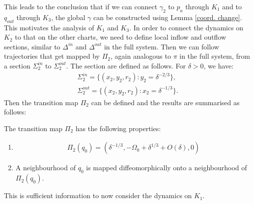 This leads to the conclusion that if we can connect $\gamma_2$ to $p_a$  through $K_1$ and to $q_{out}$ through $K_3$, the global $\gamma$ can be constructed using Lemma \ref{coord. change}.
This motivates the analysis of $K_1$ and $K_3$.
In order to connect the dynamics on $K_2$ to that on the other charts, we need to define local inflow and outflow sections, similar to $\Delta^{in}$ and $\Delta^{out}$ in the full system.
Then we can follow trajectories that get mapped by $\Pi_2$, again analogous to $\pi$ in the full system, from a section $\Sigma^{in}_2$ to $\Sigma^{out}_2$.
The section are defined as follows. For $\delta>0$, we have:
\begin{align*}
\Sigma^{in}_2= \{ (x_2,y_2,r_2): y_2= \delta^{-2/3} \},\\
\Sigma^{out}_2 = \{ (x_2,y_2,r_2): x_2 = \delta^{-1/3} \}.
\end{align*}
Then the transition map $\Pi_2$ can be defined and the results are summarised as follows:
\begin{prop}
The transition map $\Pi_2$ has the following properties:
\begin{enumerate}
\item
\begin{align*}
\Pi_2(q_0)= (\delta^{-1/3}, - \Omega_0 + \delta^{1/3} + O(\delta), 0)
\end{align*}
\item A neighbourhood of $q_0$ is mapped diffeomorphically onto a neighbourhood of $\Pi_2(q_0)$.
\end{enumerate}
\end{prop}
 
This is sufficient information to now consider the dynamics on $K_1$.

